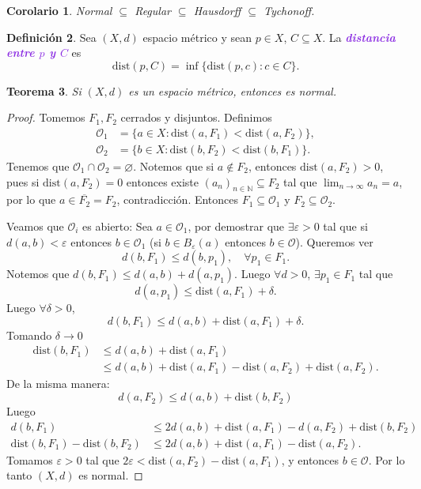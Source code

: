 \documentclass{article}
\newtheorem{theorem}{Teorema}[subsection]
\newtheorem{corollary}[theorem]{Corolario}
\theoremstyle{definition}
\newtheorem{definition}[theorem]{Definición}
\theoremstyle{remark}
\numberwithin{equation}{section}
\newcommand{\N}{\mathbb{N}}
\renewcommand{\O}{\mathcal{O}}
\newcommand{\e}{\varepsilon}
\newcommand{\oo}{\infty}
\renewcommand{\bar}{\overline}
\newcommand{\dist}{\mathrm{dist}}
\newcommand{\wea}[1]{\textcolor{BlueViolet}{\textbf{\emph{#1}}}}
\begin{document}
\begin{corollary}
  Normal $\subseteq$ Regular $\subseteq$ Hausdorff $\subseteq$ Tychonoff.
\end{corollary}

\begin{definition}
  Sea $(X,d)$ espacio métrico y sean $p \in X$, $C \subseteq X$. La \wea{distancia entre $p$ y $C$} es
  \[\dist(p,C) = \inf\{\dist(p,c) \colon c \in C\}.\]
\end{definition}

\begin{theorem}
  Si $(X,d)$ es un espacio métrico, entonces es normal.
\end{theorem}
\begin{proof}
  Tomemos $F_1,F_2$ cerrados y disjuntos. Definimos
  \begin{align*}
    \O_1 &= \{a \in X \colon \dist(a,F_1) < \dist(a,F_2)\}, \\
    \O_2 &= \{b \in X \colon \dist(b,F_2) < \dist(b,F_1)\}.
  \end{align*}
  Tenemos que $\O_1 \cap \O_2 = \varnothing$. Notemos que si $a \notin F_2$, entonces $\dist(a,F_2)>0$, pues si $\dist(a,F_2) = 0$ entonces existe $(a_n)_{n\in\N} \subseteq F_2$ tal que $\lim_{n\to\oo} a_n = a$, por lo que $a \in \bar{F_2} = F_2$, contradicción. Entonces $F_1 \subseteq \O_1$ y $F_2 \subseteq \O_2$.

  Veamos que $\O_i$ es abierto:
  Sea $a \in \O_1$, por demostrar que $\exists \e>0$ tal que si $d(a,b) < \e$ entonces $b \in \O_1$ (si $b \in B_\e(a)$ entonces $b \in \O$).
  Queremos ver
  \[d(b,F_1) \leq d(b,p_1), \quad \forall p_1 \in F_1.\]
  Notemos que $d(b,F_1) \leq d(a,b) + d(a,p_1)$. Luego $\forall d >0$, $\exists p_1 \in F_1$ tal que
  \[d(a,p_1) \leq \dist(a,F_1) + \delta.\]
  Luego $\forall \delta>0$,
  \[d(b,F_1) \leq d(a,b) + \dist(a,F_1) + \delta.\]
  Tomando $\delta \to 0$
  \begin{align*}
    \dist(b,F_1) &\leq d(a,b) + \dist(a,F_1) \\
    &\leq d(a,b) + \dist(a,F_1) - \dist(a,F_2) + \dist(a,F_2).
  \end{align*}
  De la misma manera:
  \[d(a,F_2) \leq d(a,b) + \dist(b,F_2)\]
  Luego
  \begin{align*}
    d(b,F_1) &\leq 2d(a,b) + \dist(a,F_1) - d(a,F_2) + \dist(b,F_2) \\
    \dist(b,F_1) - \dist(b,F_2) &\leq 2d(a,b) + \dist(a,F_1) - \dist(a,F_2).
  \end{align*}
  Tomamos $\e>0$ tal que $2\e < \dist(a,F_2) - \dist(a,F_1)$, y entonces $b \in \O$. Por lo tanto $(X,d)$ es normal.
\end{proof}
\end{document}
